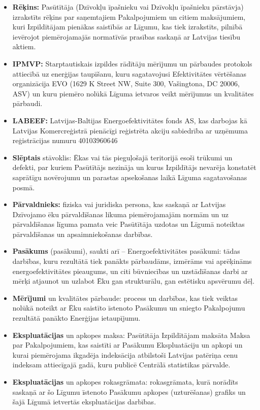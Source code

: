 \begin{multicols}{2}
\begin{itemize}[label={}]
	\item\textbf{Rēķins:} Pasūtītāja (Dzīvokļu īpašnieku vai Dzīvokļu īpašnieku pārstāvja) izrakstīts rēķins par saņemtajiem Pakalpojumiem un citiem maksājumiem, kuri Izpildītājam pienākas saistībās ar Līgumu, kas tiek izrakstīts, pilnībā ievērojot piemērojamajās normatīvās prasības saskaņā ar Latvijas tiesību aktiem.
	\item\textbf{IPMVP:} Starptautiskais izpildes rādītāju mērījumu un pārbaudes protokols attiecībā uz enerģijas taupīšanu, kuru sagatavojusi Efektivitātes vērtēšanas organizācija EVO (1629 K Street NW, Suite 300, Vašingtona, DC 20006, ASV) un kuru piemēro nolūkā Līguma ietvaros veikt mērījumus un kvalitātes pārbaudi.
	\item\textbf{LABEEF:} Latvijas-Baltijas  Energoefektivitātes fonds AS, kas darbojas kā Latvijas Komercreģistrā pienācīgi reģistrēta akciju sabiedrība ar uzņēmuma reģistrācijas numuru 40103960646
	\item\textbf{Slēptais} stāvoklis: Ēkas vai tās pieguļošajā teritorijā esoši trūkumi un defekti, par kuriem Pasūtītājs nezināja un kurus Izpildītājs nevarēja konstatēt saprātīgu novērojumu un parastas apsekošanas laikā Līguma sagatavošanas posmā.
	\item\textbf{Pārvaldnieks:} fiziska vai juridiska persona, kas saskaņā ar Latvijas Dzīvojamo ēku pārvaldīšanas likuma piemērojamajām normām un uz pārvaldīšanas līguma pamata veic Pasūtītāja uzdotas un Līgumā noteiktas pārvaldīšanas un apsaimniekošanas darbības.
	\item\textbf{Pasākums} (pasākumi), saukti arī – Energoefektivitātes pasākumi: tādas darbības, kuru rezultātā tiek panākts pārbaudāms, izmērāms vai aprēķināms energoefektivitātes pieaugums, un citi būvniecības un uzstādīšanas darbi ar mērķi atjaunot un uzlabot Ēku gan strukturālu, gan estētisku apsvērumu dēļ.
	\item\textbf{Mērījumi} un kvalitātes pārbaude: process un darbības, kas tiek veiktas nolūkā noteikt ar Ēku saistīto īstenoto Pasākumu un sniegto Pakalpojumu rezultātā panākto Enerģijas ietaupījumu.
	\item\textbf{Ekspluatācijas} un apkopes maksa: Pasūtītāja Izpildītājam maksāta Maksa par Pakalpojumiem, kas saistīti ar Pasākumu Ekspluatāciju un apkopi un kurai piemērojama ikgadēja indeksācija atbilstoši Latvijas patēriņa cenu indeksam attiecīgajā gadā, kuru publicē Centrālā statistikas pārvalde.
	\item\textbf{Ekspluatācijas} un apkopes rokasgrāmata:  rokasgrāmata, kurā norādīts saskaņā ar šo Līgumu īstenoto Pasākumu apkopes (uzturēšanas) grafiks un šajā Līgumā ietvertās ekspluatācijas darbības.

\end{itemize}
\end{multicols}
